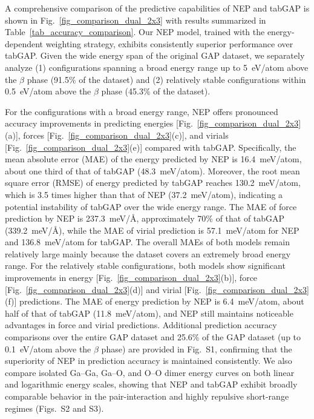 \documentclass[aip,graphicx,amsmath,amssymb]{revtex4-1}
\newcommand{\meVA}{meV/$\text{\AA}$}
\begin{document}
A comprehensive comparison of the predictive capabilities of NEP and tabGAP is
shown in Fig.~\ref{fig_comparison_dual_2x3} with results summarized in Table~\ref{tab_accuracy_comparison}. 
Our NEP model, trained with the
energy-dependent weighting strategy, exhibits consistently superior performance
over tabGAP.
Given the wide energy span of the original GAP dataset, we separately analyze
(1) configurations spanning a broad energy range up to 5~eV/atom above the $\beta$ phase 
(91.5\% of the dataset) and (2) relatively stable configurations within 
0.5~eV/atom above the $\beta$ phase (45.3\% of the dataset).

For the configurations with a broad energy range, NEP offers pronounced accuracy
improvements in predicting energies
[Fig.~\ref{fig_comparison_dual_2x3}(a)],
forces
[Fig.~\ref{fig_comparison_dual_2x3}(c)],
and virials
[Fig.~\ref{fig_comparison_dual_2x3}(e)]
compared with tabGAP.
Specifically, the mean absolute error (MAE) of the energy predicted by NEP is
16.4~meV/atom, about one third of that of tabGAP (48.3~meV/atom).
Moreover, the root mean square error (RMSE) of energy predicted by tabGAP
reaches 130.2~meV/atom, which is 3.5 times higher than that of NEP
(37.2~meV/atom), indicating a potential instability of tabGAP over the wide
energy range.
The MAE of force prediction by NEP is 237.3~\meVA, approximately 70\% 
of that of tabGAP (339.2~\meVA), while the MAE of virial prediction is
57.1~meV/atom for NEP and 136.8~meV/atom for tabGAP.
The overall MAEs of both models remain relatively large mainly because the dataset
covers an extremely broad energy range.
For the relatively stable configurations, both models show significant improvements in
energy 
[Fig.~\ref{fig_comparison_dual_2x3}(b)],
force
[Fig.~\ref{fig_comparison_dual_2x3}(d)]
and virial
[Fig.~\ref{fig_comparison_dual_2x3}(f)]
predictions.
The MAE of energy prediction by NEP is 6.4~meV/atom, about half of that of
tabGAP (11.8~meV/atom), and NEP still maintains noticeable advantages in force
and virial predictions.
Additional prediction accuracy comparisons over the entire GAP dataset and 
25.6\% of the GAP dataset (up to 0.1~eV/atom above the $\beta$ phase) are provided in Fig.~S1, 
confirming that the superiority of NEP in prediction accuracy is maintained consistently.
We also compare isolated Ga--Ga, Ga--O, and O--O dimer energy curves on both linear and logarithmic
energy scales, showing that NEP and tabGAP exhibit broadly comparable behavior in the pair-interaction
and highly repulsive short-range regimes (Figs.~S2 and S3).
\end{document}
